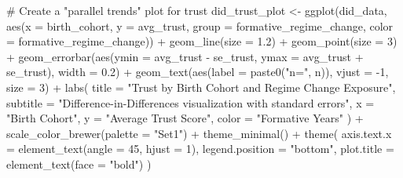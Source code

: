 \documentclass[
  letterpaper,
  DIV=11,
  numbers=noendperiod]{scrartcl}
\newenvironment{Shaded}{\begin{snugshade}}{\end{snugshade}}
\newcommand{\AttributeTok}[1]{\textcolor[rgb]{0.40,0.45,0.13}{#1}}
\newcommand{\CommentTok}[1]{\textcolor[rgb]{0.37,0.37,0.37}{#1}}
\newcommand{\DecValTok}[1]{\textcolor[rgb]{0.68,0.00,0.00}{#1}}
\newcommand{\FloatTok}[1]{\textcolor[rgb]{0.68,0.00,0.00}{#1}}
\newcommand{\FunctionTok}[1]{\textcolor[rgb]{0.28,0.35,0.67}{#1}}
\newcommand{\NormalTok}[1]{\textcolor[rgb]{0.00,0.23,0.31}{#1}}
\newcommand{\OtherTok}[1]{\textcolor[rgb]{0.00,0.23,0.31}{#1}}
\newcommand{\SpecialCharTok}[1]{\textcolor[rgb]{0.37,0.37,0.37}{#1}}
\newcommand{\StringTok}[1]{\textcolor[rgb]{0.13,0.47,0.30}{#1}}
\begin{document}
\begin{Shaded}
\begin{Highlighting}[]
\CommentTok{\# Create a "parallel trends" plot for trust}
\NormalTok{did\_trust\_plot }\OtherTok{\textless{}{-}} \FunctionTok{ggplot}\NormalTok{(did\_data, }\FunctionTok{aes}\NormalTok{(}\AttributeTok{x =}\NormalTok{ birth\_cohort, }\AttributeTok{y =}\NormalTok{ avg\_trust, }
                                  \AttributeTok{group =}\NormalTok{ formative\_regime\_change, }
                                  \AttributeTok{color =}\NormalTok{ formative\_regime\_change)) }\SpecialCharTok{+}
  \FunctionTok{geom\_line}\NormalTok{(}\AttributeTok{size =} \FloatTok{1.2}\NormalTok{) }\SpecialCharTok{+}
  \FunctionTok{geom\_point}\NormalTok{(}\AttributeTok{size =} \DecValTok{3}\NormalTok{) }\SpecialCharTok{+}
  \FunctionTok{geom\_errorbar}\NormalTok{(}\FunctionTok{aes}\NormalTok{(}\AttributeTok{ymin =}\NormalTok{ avg\_trust }\SpecialCharTok{{-}}\NormalTok{ se\_trust, }\AttributeTok{ymax =}\NormalTok{ avg\_trust }\SpecialCharTok{+}\NormalTok{ se\_trust), }\AttributeTok{width =} \FloatTok{0.2}\NormalTok{) }\SpecialCharTok{+}
  \FunctionTok{geom\_text}\NormalTok{(}\FunctionTok{aes}\NormalTok{(}\AttributeTok{label =} \FunctionTok{paste0}\NormalTok{(}\StringTok{"n="}\NormalTok{, n)), }\AttributeTok{vjust =} \SpecialCharTok{{-}}\DecValTok{1}\NormalTok{, }\AttributeTok{size =} \DecValTok{3}\NormalTok{) }\SpecialCharTok{+}
  \FunctionTok{labs}\NormalTok{(}
    \AttributeTok{title =} \StringTok{"Trust by Birth Cohort and Regime Change Exposure"}\NormalTok{,}
    \AttributeTok{subtitle =} \StringTok{"Difference{-}in{-}Differences visualization with standard errors"}\NormalTok{,}
    \AttributeTok{x =} \StringTok{"Birth Cohort"}\NormalTok{,}
    \AttributeTok{y =} \StringTok{"Average Trust Score"}\NormalTok{,}
    \AttributeTok{color =} \StringTok{"Formative Years"}
\NormalTok{  ) }\SpecialCharTok{+}
  \FunctionTok{scale\_color\_brewer}\NormalTok{(}\AttributeTok{palette =} \StringTok{"Set1"}\NormalTok{) }\SpecialCharTok{+}
  \FunctionTok{theme\_minimal}\NormalTok{() }\SpecialCharTok{+}
  \FunctionTok{theme}\NormalTok{(}
    \AttributeTok{axis.text.x =} \FunctionTok{element\_text}\NormalTok{(}\AttributeTok{angle =} \DecValTok{45}\NormalTok{, }\AttributeTok{hjust =} \DecValTok{1}\NormalTok{),}
    \AttributeTok{legend.position =} \StringTok{"bottom"}\NormalTok{,}
    \AttributeTok{plot.title =} \FunctionTok{element\_text}\NormalTok{(}\AttributeTok{face =} \StringTok{"bold"}\NormalTok{)}
\NormalTok{  )}


\end{Highlighting}
\end{Shaded}
\end{document}
